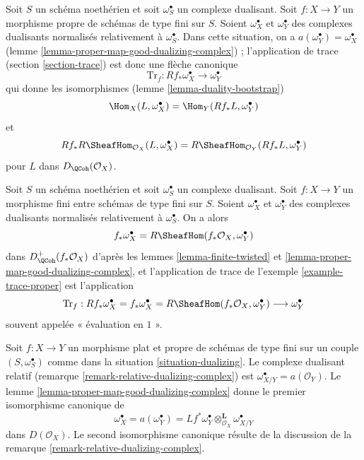 \begin{example}
\label{example-trace-proper}
Soit $S$ un schéma noethérien et soit $\omega_S^\bullet$ un complexe dualisant. Soit $f : X \to Y$ un morphisme propre de schémas de type fini sur $S$. Soient $\omega_X^\bullet$ et $\omega_Y^\bullet$ des complexes dualisants normalisés relativement à $\omega_S^\bullet$. Dans cette situation, on a $a(\omega_Y^\bullet) = \omega_X^\bullet$ (lemme \ref{lemma-proper-map-good-dualizing-complex}) ; l'application de trace (section \ref{section-trace}) est donc une flèche canonique
$$
\text{Tr}_f : Rf_*\omega_X^\bullet \longrightarrow \omega_Y^\bullet
$$
qui donne les isomorphismes (lemme \ref{lemma-duality-bootstrap})
$$
\Hom_X(L, \omega_X^\bullet) = \Hom_Y(Rf_*L, \omega_Y^\bullet)
$$
et
$$
Rf_*R\SheafHom_{\mathcal{O}_X}(L, \omega_X^\bullet) =
R\SheafHom_{\mathcal{O}_Y}(Rf_*L, \omega_Y^\bullet)
$$
pour $L$ dans $D_\QCoh(\mathcal{O}_X)$.
\end{example}

\begin{remark}
\label{remark-dualizing-finite}
Soit $S$ un schéma noethérien et soit $\omega_S^\bullet$ un complexe dualisant. Soit $f : X \to Y$ un morphisme fini entre schémas de type fini sur $S$. Soient $\omega_X^\bullet$ et $\omega_Y^\bullet$ des complexes dualisants normalisés relativement à $\omega_S^\bullet$. On a alors
$$
f_*\omega_X^\bullet = R\SheafHom(f_*\mathcal{O}_X, \omega_Y^\bullet)
$$
dans $D_\QCoh^+(f_*\mathcal{O}_X)$ d'après les lemmes \ref{lemma-finite-twisted} et \ref{lemma-proper-map-good-dualizing-complex}, et l'application de trace de l'exemple \ref{example-trace-proper} est l'application
$$
\text{Tr}_f : Rf_*\omega_X^\bullet = f_*\omega_X^\bullet =
R\SheafHom(f_*\mathcal{O}_X, \omega_Y^\bullet) \longrightarrow
\omega_Y^\bullet
$$
souvent appelée « évaluation en $1$ ».
\end{remark}

\begin{remark}
\label{remark-relative-dualizing-complex-shriek}
Soit $f : X \to Y$ un morphisme plat et propre de schémas de type fini sur un couple $(S, \omega_S^\bullet)$ comme dans la situation \ref{situation-dualizing}. Le complexe dualisant relatif (remarque \ref{remark-relative-dualizing-complex}) est $\omega_{X/Y}^\bullet = a(\mathcal{O}_Y)$. Le lemme \ref{lemma-proper-map-good-dualizing-complex} donne le premier isomorphisme canonique de
$$
\omega_X^\bullet = a(\omega_Y^\bullet) =
Lf^*\omega_Y^\bullet \otimes_{\mathcal{O}_X}^\mathbf{L} \omega_{X/Y}^\bullet
$$
dans $D(\mathcal{O}_X)$. Le second isomorphisme canonique résulte de la discussion de la remarque \ref{remark-relative-dualizing-complex}.
\end{remark}




